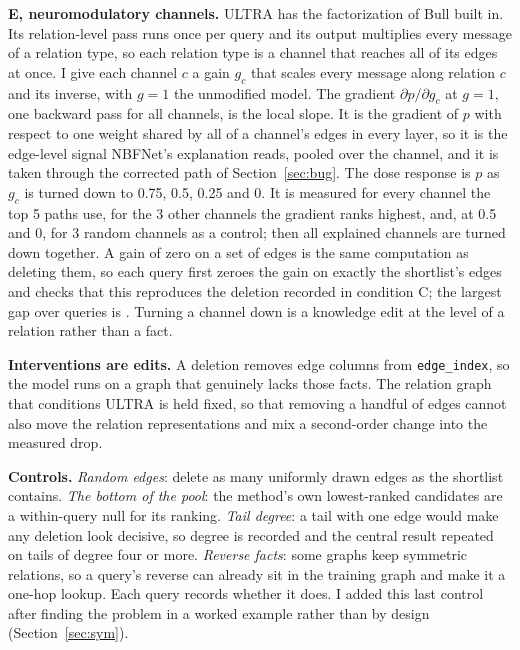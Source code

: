 \documentclass[10pt,twocolumn,letterpaper]{article}
\begin{document}
\textbf{E, neuromodulatory channels.} ULTRA has the factorization of Bull
\etal \cite{bull2025volume} built in. Its relation-level pass runs once per
query and its output multiplies every message of a relation type, so each
relation type is a channel that reaches all of its edges at once. I give each
channel \(c\) a gain \(g_c\) that scales every message along relation \(c\) and
its inverse, with \(g = 1\) the unmodified model. The gradient
\(\partial p / \partial g_c\) at \(g = 1\), one backward pass for all channels,
is the local slope. It is the gradient of \(p\) with respect to one weight
shared by all of a channel's edges in every layer, so it is the edge-level
signal NBFNet's explanation reads, pooled over the channel, and it is taken
through the corrected path of Section~\ref{sec:bug}. The dose response is \(p\) as \(g_c\) is turned down to
0.75, 0.5, 0.25 and 0. It is measured for every channel the top 5 paths use,
for the 3 other channels the gradient ranks highest, and, at 0.5 and 0, for 3
random channels as a control; then all explained channels are turned down
together. A gain of zero on a set of edges is the same computation as deleting
them, so each query first zeroes the gain on exactly the shortlist's edges and
checks that this reproduces the deletion recorded in condition C; the largest
gap over \allNmQueries{} queries is \allNmCheckGap. Turning a channel down is
a knowledge edit at the level of a relation rather than a fact.

\textbf{Interventions are edits.} A deletion removes edge columns from
\texttt{edge\_index}, so the model runs on a graph that genuinely lacks those
facts. The relation graph that conditions ULTRA is held fixed, so that removing
a handful of edges cannot also move the relation representations and mix a
second-order change into the measured drop.

\textbf{Controls.} \emph{Random edges}: delete as many uniformly drawn edges as
the shortlist contains. \emph{The bottom of the pool}: the method's own
lowest-ranked candidates are a within-query null for its ranking. \emph{Tail
degree}: a tail with one edge would make any deletion look decisive, so degree
is recorded and the central result repeated on tails of degree four or more.
\emph{Reverse facts}: some graphs keep symmetric relations, so a query's
reverse can already sit in the training graph and make it a one-hop lookup.
Each query records whether it does. I added this last control after finding
the problem in a worked example rather than by design (Section~\ref{sec:sym}).
\end{document}
